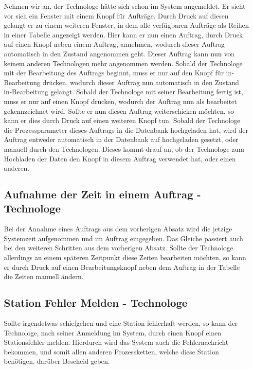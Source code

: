 \documentclass[enabledeprecatedfontcommands,fontsize=12pt,paper=a4,twoside]{scrartcl}
\begin{document}
Nehmen wir an, der Technologe hätte sich schon im System angemeldet. Er sieht vor sich ein Fenster mit einem Knopf für Aufträge. Durch Druck auf diesen gelangt er zu einem weiteren Fenster, in dem alle verfügbaren Aufträge als Reihen in einer Tabelle angezeigt werden. Hier kann er nun einen Auftrag, durch Druck auf einen Knopf neben einem Auftrag, annehmen, wodurch dieser Auftrag automatisch in den Zustand angenommen geht. Dieser Auftrag kann nun von keinem anderen Technologen mehr angenommen werden. 
Sobald der Technologe mit der Bearbeitung des Auftrags beginnt, muss er nur auf den Knopf für in-Bearbeitung drücken, wodurch dieser Auftrag nun automatisch in den Zustand in-Bearbeitung gelangt. Sobald der Technologe mit seiner Bearbeitung fertig ist, muss er nur auf einen Knopf drücken, wodurch der Auftrag nun als bearbeitet gekennzeichnet wird. Sollte er nun diesen Auftrag weiterschicken möchten, so kann er dies durch Druck auf einen weiteren Knopf tun. Sobald der Technologe die Prozessparameter dieses Auftrags in die Datenbank hochgeladen hat, wird der Auftrag entweder automatisch in der Datenbank auf hochgeladen gesetzt, oder manuell durch den Technologen. Dieses kommt drauf an, ob der Technologe zum Hochladen der Daten den Knopf in diesem Auftrag verwendet hat, oder einen anderen.

\subsection{Aufnahme der Zeit in einem Auftrag - Technologe}

Bei der Annahme eines Auftrags aus dem vorherigen Absatz wird die jetzige Systemzeit aufgenommen und im Auftrag eingegeben. Das Gleiche passiert auch bei den weiteren Schritten aus dem vorherigen Absatz.
Sollte der Technologe allerdings an einem späteren Zeitpunkt diese Zeiten bearbeiten möchten, so kann er durch Druck auf einen Bearbeitungsknopf neben dem Auftrag in der Tabelle die Zeiten manuell ändern.  

\subsection{Station Fehler Melden - Technologe}

Sollte irgendetwas schiefgehen und eine Station fehlerhaft werden, so kann der Technologe, nach seiner Anmeldung im System, durch einen Knopf einen Stationsfehler melden. Hierdurch wird das System auch die Fehlernachricht bekommen, und somit allen anderen Prozessketten, welche diese Station benötigen, darüber Bescheid geben. 
\end{document}
